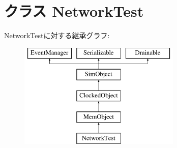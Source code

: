 \hypertarget{classNetworkTest_1_1NetworkTest}{
\section{クラス NetworkTest}
\label{classNetworkTest_1_1NetworkTest}
}
NetworkTestに対する継承グラフ:\begin{figure}[H]
\begin{center}
\leavevmode
\includegraphics[height=5cm]{classNetworkTest_1_1NetworkTest}
\end{center}
\end{figure}
